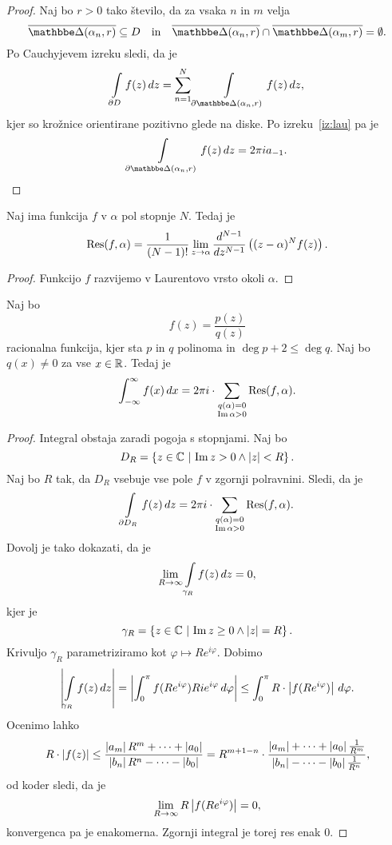 \begin{proof}
Naj bo $r > 0$ tako število, da za vsaka $n$ in $m$ velja
\[
\oline{\dsk(\alpha_n, r)} \subseteq D
\quad \text{in} \quad
\oline{\dsk(\alpha_n, r)} \cap \oline{\dsk(\alpha_m, r)} =
\emptyset.
\]
Po Cauchyjevem izreku sledi, da je
\[
\lint_{\partial D} f(z)\,dz =
\sum_{n = 1}^N \lint_{\partial \dsk(\alpha_n, r)} f(z)\,dz,
\]
kjer so krožnice orientirane pozitivno glede na diske. Po
izreku~\ref{iz:lau} pa je
\[
\lint_{\partial \dsk(\alpha_n, r)} f(z)\,dz = 2 \pi i a_{-1}.
\qedhere
\]
\end{proof}

\begin{trditev}
Naj ima funkcija $f$ v $\alpha$ pol stopnje $N$. Tedaj je
\[
\operatorname{Res}(f, \alpha) =
\frac{1}{(N-1)!} \lim_{z \to \alpha}
\frac{d^{N-1}}{dz^{N-1}} \left((z - \alpha)^N f(z)\right).
\]
\end{trditev}

\begin{proof}
Funkcijo $f$ razvijemo v Laurentovo vrsto okoli $\alpha$.
\end{proof}


\begin{trditev}
Naj bo
\[
f(z) = \frac{p(z)}{q(z)}
\]
racionalna funkcija, kjer sta $p$ in $q$ polinoma in
$\deg p + 2 \leq \deg q$. Naj bo $q(x) \ne 0$ za vse $x \in \mathbb{R}$.
Tedaj je
\[
\int_{-\infty}^\infty f(x)\,dx = 2 \pi i \cdot
\sum_{\substack{q(\alpha) = 0 \\ \operatorname{Im} \alpha > 0}} \operatorname{Res}(f, \alpha).
\]
\end{trditev}

\begin{proof}
Integral obstaja zaradi pogoja s stopnjami. Naj bo
\[
D_R = \left\{z \in \mathbb{C}~\middle\vert~\operatorname{Im} z > 0 \land \left\lvert z\right\rvert < R\right\}.
\]
Naj bo $R$ tak, da $D_R$ vsebuje vse pole $f$ v zgornji polravnini.
Sledi, da je
\[
\int\limits_{\partial D_R} f(z)\,dz = 2 \pi i \cdot
\sum_{\substack{q(\alpha) = 0 \\ \operatorname{Im} \alpha > 0}} \operatorname{Res}(f, \alpha).
\]
Dovolj je tako dokazati, da je
\[
\lim_{R \to \infty} \int\limits_{\gamma_R} f(z)\,dz = 0,
\]
kjer je
\[
\gamma_R = \left\{z \in \mathbb{C}~\middle\vert~\operatorname{Im} z \geq 0 \land \left\lvert z\right\rvert = R\right\}.
\]
Krivuljo $\gamma_R$ parametriziramo kot
$\varphi \mapsto R e^{i \varphi}$. Dobimo
\[
\left\lvert \int\limits_{\gamma_R} f(z)\,dz\right\rvert =
\left\lvert \int_0^\pi f(R e^{i \varphi})
R i e^{i \varphi}\,d\varphi\right\rvert \leq
\int_0^\pi
R \cdot \left\lvert f(R e^{i \varphi})\right\rvert\,d\varphi.
\]
Ocenimo lahko
\[
R \cdot \left\lvert f(z)\right\rvert \leq
\frac{\left\lvert a_m\right\rvert R^m + \dots + \left\lvert a_0\right\rvert}
{\left\lvert b_n\right\rvert R^n - \dots - \left\lvert b_0\right\rvert} =
R^{m+1-n} \cdot
\frac{\left\lvert a_m\right\rvert + \dots + \left\lvert a_0\right\rvert \frac{1}{R^m}}
{\left\lvert b_n\right\rvert - \dots - \left\lvert b_0\right\rvert \frac{1}{R^n}},
\]
od koder sledi, da je
\[
\lim_{R \to \infty} R \left\lvert f(R e^{i \varphi})\right\rvert = 0,
\]
konvergenca pa je enakomerna. Zgornji integral je torej res enak
$0$.
\end{proof}

